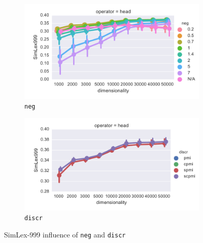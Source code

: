 \begin{figure}
  \centering

  \begin{subfigure}[t]{0.49\textwidth}
  \includegraphics[width=\textwidth]{supplement/figures/SimLex999-interaction-neg}

  \caption{\texttt{neg}}
  \label{fig:SimLex999-neg}
  \end{subfigure}
  \begin{subfigure}[t]{0.49\textwidth}
  \includegraphics[width=\textwidth]{supplement/figures/SimLex999-interaction-discr}

  \caption{\texttt{discr}}
  \label{fig:SimLex999-discr}
  \end{subfigure}

  \caption{SimLex-999 influence of \texttt{neg} and \texttt{discr}}
\end{figure}
